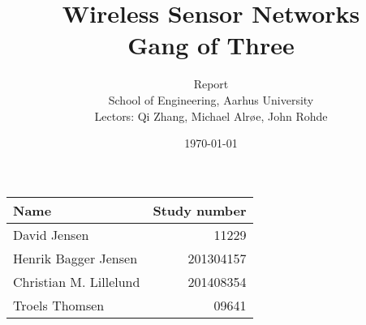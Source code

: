 \documentclass[a4paper,11pt,oneside]{memoir}
\title{Wireless Sensor Networks \\ Gang of Three}
\author{Report \\ School of Engineering, Aarhus University \\ Lectors: Qi Zhang, Michael Alrøe, John Rohde }
\date{\today}
\begin{document}
\fancyhf{} %
\frontmatter
\maketitle
\vfill



\begin{table} [h]
	\centering
	\begin{tabular}{|l|r|}
		\hline 
		\textbf{Name} 				& \textbf{Study number} \\ \hline
		David Jensen 				& 11229 	 			\\ \hline
		Henrik Bagger Jensen 		& 201304157  			\\ \hline
		Christian M. Lillelund 		& 201408354  			\\ \hline
		Troels Thomsen 				& 09641		 			\\ \hline
		
	\end{tabular}
\end{table}

\vfill

\clearpage
\pagestyle{plain}

\tableofcontents

\vfill

\mainmatter
\pagestyle{fancy}
\fancyhf{} %
\fancyhead[CO]{\nouppercase{\leftmark}}
\fancyfoot[C]{\nouppercase{\rightmark}}
\fancyfoot[RO]{\thepage}

\begin{multicols}{2}
								   
											
							
					
										
								      
									
									
\end{multicols}
									

\end{document}
